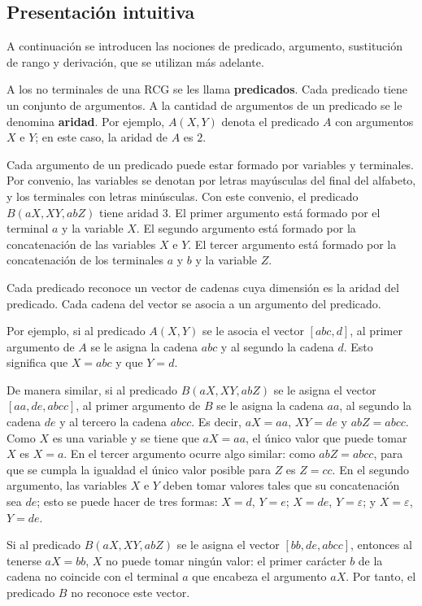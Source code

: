 \subsection{Presentación intuitiva}

A continuación se introducen las nociones de predicado, argumento,
sustitución de rango y derivación, que se utilizan más adelante.

A los no terminales de una RCG se les llama \textbf{predicados}. Cada
predicado tiene un conjunto de argumentos. A la cantidad de argumentos
de un predicado se le denomina \textbf{aridad}. Por ejemplo, $A(X, Y)$
denota el predicado $A$ con argumentos $X$ e $Y$; en este caso, la
aridad de $A$ es $2$.

Cada argumento de un predicado puede estar formado por variables y
terminales. Por convenio, las variables se denotan por letras mayúsculas
del final del alfabeto, y los terminales con letras minúsculas. Con este
convenio, el predicado $B(aX, XY, abZ)$ tiene aridad $3$. El primer
argumento está formado por el terminal $a$ y la variable $X$. El
segundo argumento está formado por la concatenación de las variables
$X$ e $Y$. El tercer argumento está formado por la concatenación de los
terminales $a$ y $b$ y la variable $Z$.

Cada predicado reconoce un vector de cadenas cuya dimensión es la
aridad del predicado. Cada cadena del vector se asocia a un argumento
del predicado.

Por ejemplo, si al predicado $A(X, Y)$ se le asocia el vector $[abc,
d]$, al primer argumento de $A$ se le asigna la cadena $abc$ y al
segundo la cadena $d$. Esto significa que $X = abc$ y que $Y = d$.

De manera similar, si al predicado $B(aX, XY, abZ)$ se le asigna el
vector $[aa, de, abcc]$, al primer argumento de $B$ se le asigna la
cadena $aa$, al segundo la cadena $de$ y al tercero la cadena $abcc$.
Es decir, $aX = aa$, $XY = de$ y $abZ = abcc$. Como $X$ es una variable
y se tiene que $aX = aa$, el único valor que puede tomar $X$ es $X = a$.
En el tercer argumento ocurre algo similar: como $abZ = abcc$, para que
se cumpla la igualdad el único valor posible para $Z$ es $Z = cc$. En el
segundo argumento, las variables $X$ e $Y$ deben tomar valores tales que
su concatenación sea $de$; esto se puede hacer de tres formas:
$X = d$, $Y = e$; $X = de$, $Y = \varepsilon$; y $X = \varepsilon$,
$Y = de$.

Si al predicado $B(aX, XY, abZ)$ se le asigna el vector
$[bb, de, abcc]$, entonces al tenerse $aX = bb$, $X$ no puede tomar
ningún valor: el primer carácter $b$ de la cadena no coincide con el
terminal $a$ que encabeza el argumento $aX$. Por tanto, el predicado
$B$ no reconoce este vector.

